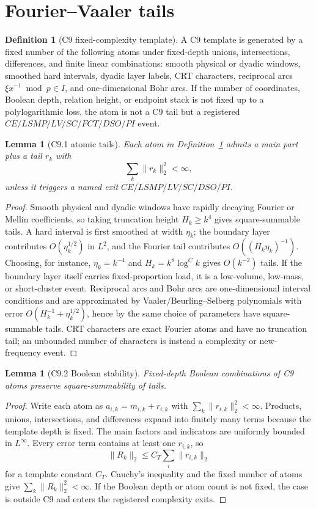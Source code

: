 \documentclass[11pt]{article}
\newtheorem{lemma}[theorem]{Lemma}
\theoremstyle{definition}
\newtheorem{definition}[theorem]{Definition}
\begin{document}
\section{Fourier--Vaaler tails}\label{sec:tail}
\begin{definition}[C9 fixed-complexity template]\label{def:c9-template}
A C9 template is generated by a fixed number of the following atoms under fixed-depth unions, intersections, differences, and finite linear combinations: smooth physical or dyadic windows, smoothed hard intervals, dyadic layer labels, CRT characters, reciprocal arcs $\xi x^{-1}\bmod p\in I$, and one-dimensional Bohr arcs.  If the number of coordinates, Boolean depth, relation height, or endpoint stack is not fixed up to a polylogarithmic loss, the atom is not a C9 tail but a registered $CE/LSMP/LV/SC/FCT/DSO/PI$ event.
\end{definition}

\begin{lemma}[C9.1 atomic tails]\label{lem:c9-atomic}
Each atom in Definition~\ref{def:c9-template} admits a main part plus a tail $r_k$ with
\[
  \sum_k\|r_k\|_2^2<\infty,
\]
unless it triggers a named exit $CE/LSMP/LV/SC/DSO/PI$.
\end{lemma}
\begin{proof}
Smooth physical and dyadic windows have rapidly decaying Fourier or Mellin coefficients, so taking truncation height $H_k\ge k^4$ gives square-summable tails.  A hard interval is first smoothed at width $\eta_k$; the boundary layer contributes $O(\eta_k^{1/2})$ in $L^2$, and the Fourier tail contributes $O((H_k\eta_k)^{-1})$.  Choosing, for instance, $\eta_k=k^{-4}$ and $H_k=k^8\log^C k$ gives $O(k^{-2})$ tails.  If the boundary layer itself carries fixed-proportion load, it is a low-volume, low-mass, or short-cluster event.  Reciprocal arcs and Bohr arcs are one-dimensional interval conditions and are approximated by Vaaler/Beurling--Selberg polynomials with error $O(H_k^{-1}+\eta_k^{1/2})$, hence by the same choice of parameters have square-summable tails.  CRT characters are exact Fourier atoms and have no truncation tail; an unbounded number of characters is instead a complexity or new-frequency event.
\end{proof}

\begin{lemma}[C9.2 Boolean stability]\label{lem:c9-boolean}
Fixed-depth Boolean combinations of C9 atoms preserve square-summability of tails.
\end{lemma}
\begin{proof}
Write each atom as $a_{i,k}=m_{i,k}+r_{i,k}$ with $\sum_k\|r_{i,k}\|_2^2<\infty$.  Products, unions, intersections, and differences expand into finitely many terms because the template depth is fixed.  The main factors and indicators are uniformly bounded in $L^\infty$.  Every error term contains at least one $r_{i,k}$, so
\[
  \|R_k\|_2\le C_T\sum_i\|r_{i,k}\|_2
\]
for a template constant $C_T$.  Cauchy's inequality and the fixed number of atoms give $\sum_k\|R_k\|_2^2<\infty$.  If the Boolean depth or atom count is not fixed, the case is outside C9 and enters the registered complexity exits.
\end{proof}
\end{document}
